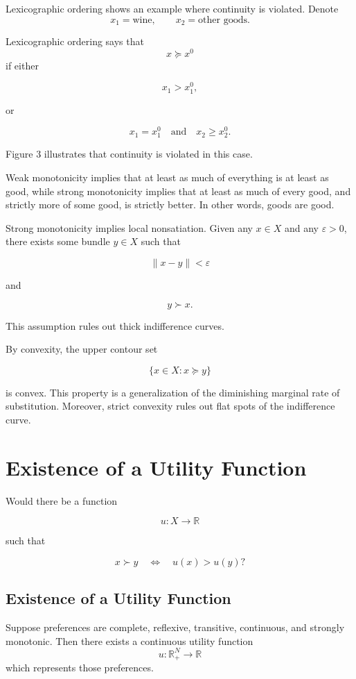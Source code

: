 Lexicographic ordering shows an example where continuity is violated.  
Denote
\[
x_1 = \text{wine},
\qquad
x_2 = \text{other goods}.
\]

Lexicographic ordering says that
\[
x \succeq x^0
\]
if either

\[
x_1 > x_1^0,
\]

or

\[
x_1 = x_1^0
\quad \text{and} \quad
x_2 \ge x_2^0.
\]

Figure 3 illustrates that continuity is violated in this case.

Weak monotonicity implies that at least as much of everything is at least as good, while strong monotonicity implies that at least as much of every good, and strictly more of some good, is strictly better. In other words, goods are good.

Strong monotonicity implies local nonsatiation. Given any \(x \in X\) and any \(\varepsilon > 0\), there exists some bundle \(y \in X\) such that

\[
\|x-y\| < \varepsilon
\]

and

\[
y \succ x.
\]

This assumption rules out thick indifference curves.

By convexity, the upper contour set

\[
\{x \in X : x \succeq y\}
\]

is convex. This property is a generalization of the diminishing marginal rate of substitution. Moreover, strict convexity rules out flat spots of the indifference curve.

\section{Existence of a Utility Function}

Would there be a function

\[
u : X \to \mathbb{R}
\]

such that

\[
x \succ y
\quad \Longleftrightarrow \quad
u(x) > u(y)?
\]




\subsection{Existence of a Utility Function}

\begin{theorem}
Suppose preferences are complete, reflexive, transitive, continuous, and strongly monotonic. Then there exists a continuous utility function
\[
u : \mathbb{R}_+^N \to \mathbb{R}
\]
which represents those preferences.
\end{theorem}

